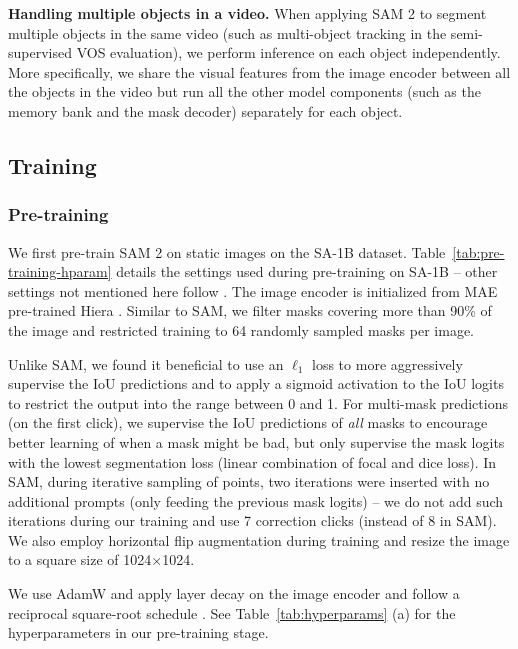 \documentclass[]{fairmeta}
\renewcommand{\paragraph}[1]{\vspace{1.25mm}\noindent\textbf{#1}}
\newcommand{\tabref}[1]{Table~\ref{#1}}
\renewcommand{\paragraph}[1]{\vspace{1.25mm}\noindent\textbf{#1}}
\begin{document}
\paragraph{Handling multiple objects in a video.} %
When applying SAM 2 to segment multiple objects in the same video (such as multi-object tracking in the semi-supervised VOS evaluation), we perform inference on each object independently. More specifically, we share the visual features from the image encoder between all the objects in the video but run all the other model components (such as the memory bank and the mask decoder) separately for each object.

\subsection{Training}
\label{app:savi_model_training}

\subsubsection{Pre-training}
\label{app:savi_model_pretraining}

We first pre-train SAM 2 on static images on the SA-1B dataset. \tabref{tab:pre-training-hparam} details the settings used during pre-training on SA-1B -- other settings not mentioned here follow \citet{kirillov2023segment}. The image encoder is initialized from MAE pre-trained Hiera \citep{hiera}. Similar to SAM, we filter masks covering more than 90\% of the image and restricted training to 64 randomly sampled masks per image.

Unlike SAM, we found it beneficial to use an $\ell_1$ loss to more aggressively supervise the IoU predictions and to apply a sigmoid activation to the IoU logits to restrict the output into the range between 0 and 1. For multi-mask predictions (on the first click), we supervise the IoU predictions of \textit{all} masks to encourage better learning of when a mask might be bad, but only supervise the mask logits with the lowest segmentation loss (linear combination of focal and dice loss). In SAM, during iterative sampling of points, two iterations were inserted with no additional prompts (only feeding the previous mask logits) -- we do not add such iterations during our training and use 7 correction clicks (instead of 8 in SAM). We also employ horizontal flip augmentation during training and resize the image to a square size of 1024$\times$1024. 

We use AdamW \citep{adamw} and apply layer decay \citep{electra} on the image encoder and follow a reciprocal square-root schedule \citep{zhai2022scaling}. See \tabref{tab:hyperparams} (a) for the hyperparameters in our pre-training stage.
\end{document}
